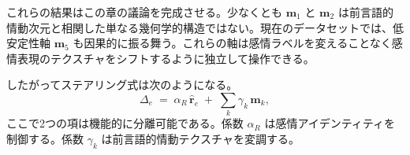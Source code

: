 これらの結果はこの章の議論を完成させる。少なくとも $\mathbf{m}_1$ と $\mathbf{m}_2$ は前言語的情動次元と相関した単なる幾何学的構造ではない。現在のデータセットでは、低安定性軸 $\mathbf{m}_5$ も因果的に振る舞う。これらの軸は感情ラベルを変えることなく感情表現のテクスチャをシフトするように独立して操作できる。\par
したがってステアリング式は次のようになる。
\[
\Delta_e \;=\; \alpha_R\,\hat{\mathbf{r}}_e \;+\; \sum_{k}\gamma_k\,\mathbf{m}_k,
\]
ここで2つの項は機能的に分離可能である。係数 $\alpha_R$ は感情アイデンティティを制御する。係数 $\gamma_k$ は前言語的情動テクスチャを変調する。\par
